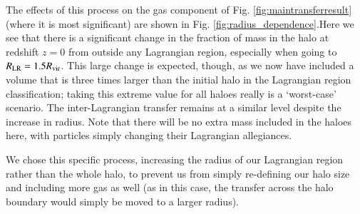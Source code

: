 The effects of this process on the gas component of Fig.
\ref{fig:maintransferresult} (where it is most significant) are shown in Fig.
\ref{fig:radius_dependence}.Here we see that there is a significant change in
the fraction of mass in the halo at redshift $z=0$ from outside any
Lagrangian region, especially when going to $R_{\rm LR} = 1.5 R_{\rm vir}$.
This large change is expected, though, as we now have included a volume that
is three times larger than the initial halo in the Lagrangian region
classification; taking this extreme value for all haloes really is a
`worst-case' scenario. The inter-Lagrangian transfer remains at a similar
level despite the increase in radius. Note that there will be no extra mass
included in the haloes here, with particles simply changing their Lagrangian
allegiances.

We chose this specific process, increasing the radius of our Lagrangian
region rather than the whole halo, to prevent us from simply re-defining our
halo size and including more gas as well (as in this case, the transfer
across the halo boundary would simply be moved to a larger radius). 